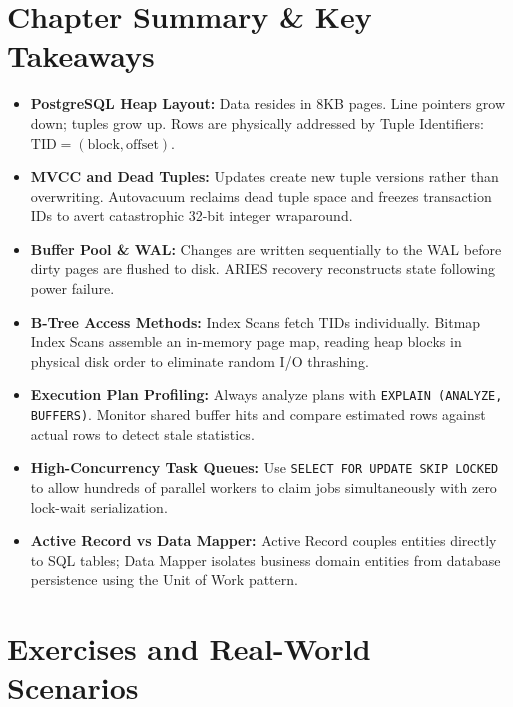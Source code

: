 \section{Chapter Summary \& Key Takeaways}

\begin{itemize}[leftmargin=15pt]
  \item \textbf{PostgreSQL Heap Layout:} Data resides in 8KB pages. Line pointers grow down; tuples grow up. Rows are physically addressed by Tuple Identifiers: $\text{TID} = (\text{block}, \text{offset})$.
  \item \textbf{MVCC and Dead Tuples:} Updates create new tuple versions rather than overwriting. Autovacuum reclaims dead tuple space and freezes transaction IDs to avert catastrophic 32-bit integer wraparound.
  \item \textbf{Buffer Pool \& WAL:} Changes are written sequentially to the WAL before dirty pages are flushed to disk. ARIES recovery reconstructs state following power failure.
  \item \textbf{B-Tree Access Methods:} Index Scans fetch TIDs individually. Bitmap Index Scans assemble an in-memory page map, reading heap blocks in physical disk order to eliminate random I/O thrashing.
  \item \textbf{Execution Plan Profiling:} Always analyze plans with \texttt{EXPLAIN (ANALYZE, BUFFERS)}. Monitor shared buffer hits and compare estimated rows against actual rows to detect stale statistics.
  \item \textbf{High-Concurrency Task Queues:} Use \texttt{SELECT FOR UPDATE SKIP LOCKED} to allow hundreds of parallel workers to claim jobs simultaneously with zero lock-wait serialization.
  \item \textbf{Active Record vs Data Mapper:} Active Record couples entities directly to SQL tables; Data Mapper isolates business domain entities from database persistence using the Unit of Work pattern.
\end{itemize}

\section{Exercises and Real-World Scenarios}


